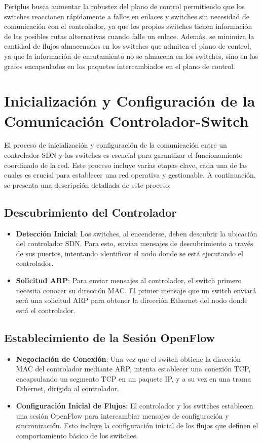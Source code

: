 \documentclass[a4paper, 12pt]{book}
\begin{document}
	Periplus busca aumentar la robustez del plano de control permitiendo que los switches reaccionen rápidamente a fallos en enlaces y switches sin necesidad de comunicación con el controlador, ya que los propios switches tienen información de las posibles rutas alternativas cuando falle un enlace.
	Además. se minimiza la cantidad de flujos almacenados en los switches que admiten el plano de control, ya que la información de enrutamiento no se almacena en los switches, sino en los grafos encapsulados en los paquetes intercambiados en el plano de control.
	
	
	\section{Inicialización y Configuración de la Comunicación Controlador-Switch}
	
	El proceso de inicialización y configuración de la comunicación entre un controlador SDN y los switches es esencial para garantizar el funcionamiento coordinado de la red. Este proceso incluye varias etapas clave, cada una de las cuales es crucial para establecer una red operativa y gestionable. A continuación, se presenta una descripción detallada de este proceso:
	
	\subsection{Descubrimiento del Controlador}
	\begin{itemize}
		\item \textbf{Detección Inicial}: Los switches, al encenderse, deben descubrir la ubicación del controlador SDN. Para esto, envían mensajes de descubrimiento a través de sus puertos, intentando identificar el nodo donde se está ejecutando el controlador.
		\item \textbf{Solicitud ARP}: Para enviar mensajes al controlador, el switch primero necesita conocer su dirección MAC. El primer mensaje que un switch enviará será una solicitud ARP para obtener la dirección Ethernet del nodo donde está el controlador.
	\end{itemize}
	
	\subsection{Establecimiento de la Sesión OpenFlow}
	\begin{itemize}
		\item \textbf{Negociación de Conexión}: Una vez que el switch obtiene la dirección MAC del controlador mediante ARP, intenta establecer una conexión TCP, encapsulando un segmento TCP en un paquete IP, y a su vez en una trama Ethernet, dirigida al controlador.
		\item \textbf{Configuración Inicial de Flujos}: El controlador y los switches establecen una sesión OpenFlow para intercambiar mensajes de configuración y sincronización. Esto incluye la configuración inicial de los flujos que definen el comportamiento básico de los switches.
	\end{itemize}
	
\end{document}
